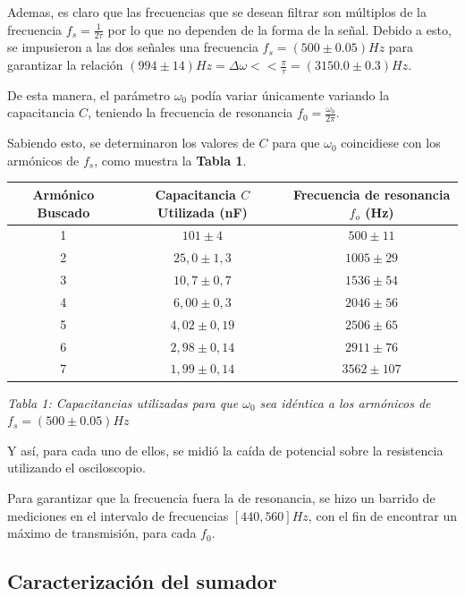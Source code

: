 \documentclass[11pt,a4paper]{article}
\begin{document}
Ademas, es claro que las frecuencias que se desean filtrar son múltiplos de la frecuencia $f_s = \frac{1}{2\tau}$ por lo que no dependen de la forma de la señal. Debido a esto, se impusieron a las dos señales una frecuencia $f_s = (500 \pm 0.05) Hz$ para garantizar la relación $(994\pm 14)Hz=\Delta\omega << \frac{\pi}{\tau} = (3150.0 \pm 0.3)Hz$.

De esta manera, el parámetro $\omega_0$ podía variar únicamente variando la capacitancia $C$, teniendo la frecuencia de resonancia $f_0= \frac{\omega_0}{2\pi}$.

Sabiendo esto, se determinaron los valores de $C$ para que $\omega_0$ coincidiese con los armónicos de $f_s$, como muestra la \textbf{Tabla 1}.

\begin{center}

\begin{tabular}{||c|c|c||}
\hline 
\textbf{Armónico Buscado} & \textbf{Capacitancia $C$ Utilizada (nF)} & \textbf{Frecuencia de resonancia $f_o$ (Hz)} \\ \hline 
 1 & $101 \pm 4$ & $500 \pm 11$ \\ \hline 
 2 & $25,0 \pm 1,3$ & $1005 \pm 29$ \\ \hline 
 3 & $10,7 \pm 0,7$ & $1536 \pm 54$ \\ \hline 
 4 & $6,00 \pm 0,3$ & $2046 \pm 56$ \\ \hline 
 5 & $4,02 \pm 0,19$ & $2506 \pm 65$ \\ \hline 
 6 & $2,98 \pm 0,14$ & $2911 \pm 76$ \\ \hline 
 7 & $1,99 \pm 0,14$ & $3562 \pm 107$ \\ \hline
\end{tabular}

\textit{Tabla 1: Capacitancias utilizadas para que $\omega_0$ sea idéntica a los armónicos de $f_s = (500 \pm 0.05) Hz$}

\end{center}

 Y así, para cada uno de ellos, se midió la caída de potencial sobre la resistencia utilizando el osciloscopio. 

Para garantizar que la frecuencia fuera la de resonancia, se hizo un barrido de mediciones en el intervalo de frecuencias $[440,560] Hz$, con el fin de encontrar un máximo de transmisión, para cada $f_0$.


\subsection{Caracterización del sumador}
\end{document}
